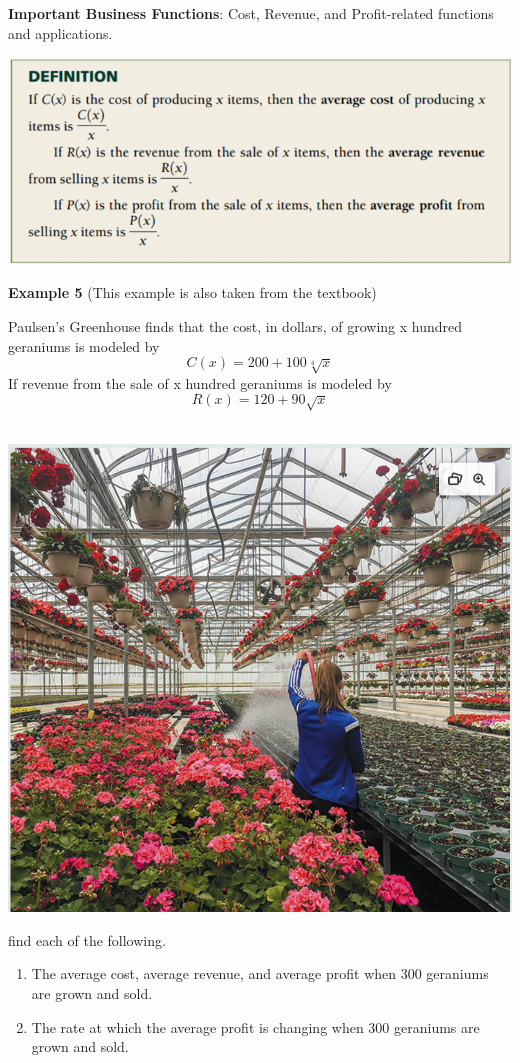 \documentclass[
]{book}
\begin{document}
\textbf{Important Business Functions}: Cost, Revenue, and Profit-related functions and applications.

\begin{center}\includegraphics[width=0.7\linewidth]{img03/w03-AvgCostRevnueProfit} \end{center}

\textbf{Example 5} (This example is also taken from the textbook)

Paulsen's Greenhouse finds that the cost, in dollars, of growing x hundred geraniums is modeled by
\[
C(x) = 200 + 100 \sqrt[4]{x}
\]
If revenue from the sale of x hundred geraniums is modeled by
\[
R(x) = 120 + 90\sqrt{x}
\]\\

\begin{center}\includegraphics[width=0.55\linewidth]{img03/w03-geraniums} \end{center}

find each of the following.

\begin{enumerate}
\def\labelenumi{(\alph{enumi})}
\item
  The average cost, average revenue, and average profit when 300 geraniums are grown and sold.
\item
  The rate at which the average profit is changing when 300 geraniums are grown and sold.
\end{enumerate}
\end{document}
